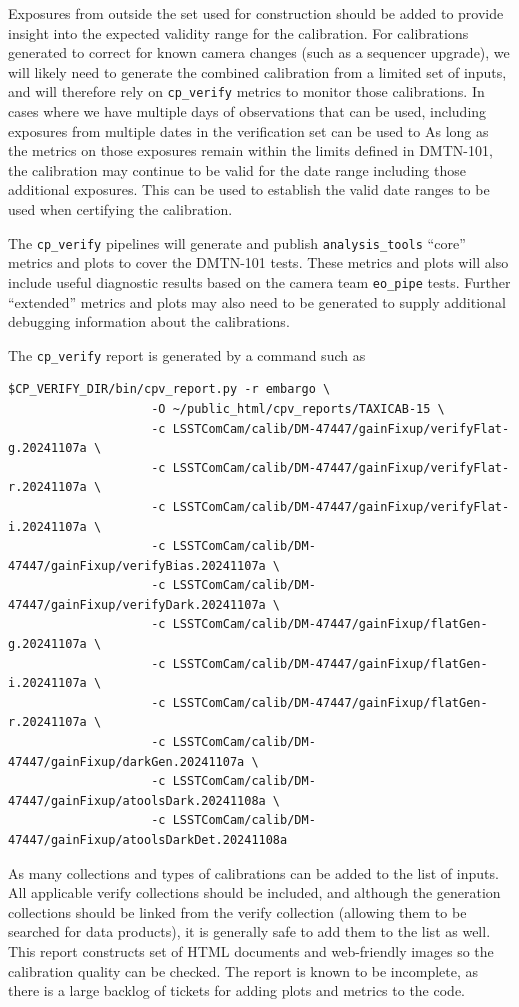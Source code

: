 \documentclass[DM,authoryear,toc]{lsstdoc}
\begin{document}
Exposures from outside the set used for construction should be added to provide insight into the expected validity range for the calibration.
For calibrations generated to correct for known camera changes (such as a sequencer upgrade), we will likely need to generate the combined calibration from a limited set of inputs, and will therefore rely on \verb|cp_verify| metrics to monitor those calibrations.
In cases where we have multiple days of observations that can be used, including exposures from multiple dates in the verification set can be used to
As long as the metrics on those exposures remain within the limits defined in DMTN-101, the calibration may continue to be valid for the date range including those additional exposures.
This can be used to establish the valid date ranges to be used when certifying the calibration.

The \verb|cp_verify| pipelines will generate and publish \verb|analysis_tools| ``core'' metrics and plots to cover the DMTN-101 tests.
These metrics and plots will also include useful diagnostic results based on the camera team \verb|eo_pipe| tests.
Further ``extended'' metrics and plots may also need to be generated to supply additional debugging information about the calibrations.

The \verb|cp_verify| report is generated by a command such as
\begin{verbatim}
$CP_VERIFY_DIR/bin/cpv_report.py -r embargo \
                    -O ~/public_html/cpv_reports/TAXICAB-15 \
                    -c LSSTComCam/calib/DM-47447/gainFixup/verifyFlat-g.20241107a \
                    -c LSSTComCam/calib/DM-47447/gainFixup/verifyFlat-r.20241107a \
                    -c LSSTComCam/calib/DM-47447/gainFixup/verifyFlat-i.20241107a \
                    -c LSSTComCam/calib/DM-47447/gainFixup/verifyBias.20241107a \
                    -c LSSTComCam/calib/DM-47447/gainFixup/verifyDark.20241107a \
                    -c LSSTComCam/calib/DM-47447/gainFixup/flatGen-g.20241107a \
                    -c LSSTComCam/calib/DM-47447/gainFixup/flatGen-i.20241107a \
                    -c LSSTComCam/calib/DM-47447/gainFixup/flatGen-r.20241107a \
                    -c LSSTComCam/calib/DM-47447/gainFixup/darkGen.20241107a \
                    -c LSSTComCam/calib/DM-47447/gainFixup/atoolsDark.20241108a \
                    -c LSSTComCam/calib/DM-47447/gainFixup/atoolsDarkDet.20241108a
\end{verbatim}
As many collections and types of calibrations can be added to the list of inputs.
All applicable verify collections should be included, and although the generation collections should be linked from the verify collection (allowing them to be searched for data products), it is generally safe to add them to the list as well.
This report constructs set of HTML documents and web-friendly images so the calibration quality can be checked.
The report is known to be incomplete, as there is a large backlog of tickets for adding plots and metrics to the code.
\end{document}
